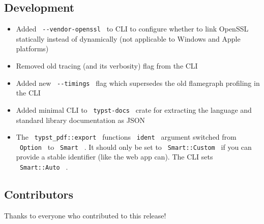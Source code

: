 \subsection{Development}\label{development}

\begin{itemize}
\tightlist
\item
  Added \texttt{\ -\/-vendor-openssl\ } to CLI to configure whether to
  link OpenSSL statically instead of dynamically (not applicable to
  Windows and Apple platforms)
\item
  Removed old tracing (and its verbosity) flag from the CLI
\item
  Added new \texttt{\ -\/-timings\ } flag which supersedes the old
  flamegraph profiling in the CLI
\item
  Added minimal CLI to \texttt{\ typst-docs\ } crate for extracting the
  language and standard library documentation as JSON
\item
  The \texttt{\ typst\_pdf::export\ } function\textquotesingle s
  \texttt{\ ident\ } argument switched from \texttt{\ Option\ } to
  \texttt{\ Smart\ } . It should only be set to
  \texttt{\ Smart::Custom\ } if you can provide a stable identifier
  (like the web app can). The CLI sets \texttt{\ Smart::Auto\ } .
\end{itemize}

\subsection{Contributors}\label{contributors}

Thanks to everyone who contributed to this release!

